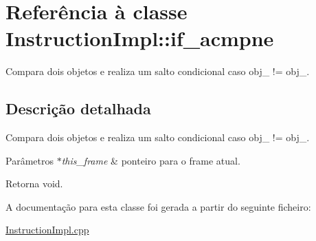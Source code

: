 \hypertarget{class_instruction_impl_1_1if__acmpne}{}\section{Referência à classe Instruction\+Impl\+:\+:if\+\_\+acmpne}
\label{class_instruction_impl_1_1if__acmpne}


Compara dois objetos e realiza um salto condicional caso obj\+\_ != obj\+\_.  




\subsection{Descrição detalhada}
Compara dois objetos e realiza um salto condicional caso obj\+\_ != obj\+\_. 


\begin{DoxyParams}{Parâmetros}
{\em $\ast$this\+\_\+frame} & ponteiro para o frame atual. \\
\hline
\end{DoxyParams}
\begin{DoxyReturn}{Retorna}
void. 
\end{DoxyReturn}


A documentação para esta classe foi gerada a partir do seguinte ficheiro\+:\begin{DoxyCompactItemize}
\item 
\hyperlink{_instruction_impl_8cpp}{Instruction\+Impl.\+cpp}\end{DoxyCompactItemize}
